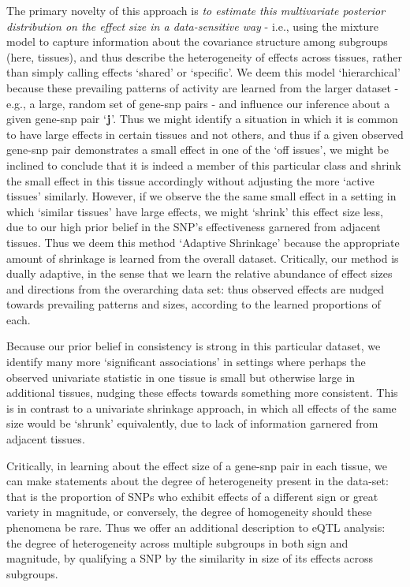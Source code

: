 The primary novelty of this approach is {\it to estimate this multivariate posterior distribution on the effect size in a data-sensitive way} - i.e., using the mixture model to capture information about the covariance structure among subgroups (here, tissues), and thus describe the heterogeneity of effects across tissues, rather than simply calling effects `shared' or `specific'. We deem this model `hierarchical' because these prevailing patterns of activity are learned from the larger dataset - e.g., a large, random set of gene-snp pairs - and influence our inference about a given gene-snp pair `$\bf{j}$'. Thus we might identify a situation in which it is common to have large effects in certain tissues and not others, and thus if a given observed gene-snp pair demonstrates a small effect in one of the `off issues', we might be inclined to conclude that it is indeed a member of this particular class and shrink the small effect in this tissue accordingly without adjusting the more `active tissues' similarly. However, if we observe the the same small effect in a setting in which `similar tissues' have large effects, we might `shrink' this effect size less, due to our high prior belief in the SNP's effectiveness garnered from adjacent tissues. Thus we deem this method `Adaptive Shrinkage' because the appropriate amount of shrinkage is learned from the overall dataset. Critically, our method is dually adaptive, in the sense that we learn the relative abundance of effect sizes and directions from the overarching data set: thus observed effects are nudged towards prevailing patterns and sizes, according to the learned proportions of each.

Because our prior belief in consistency is strong in this particular dataset, we identify many more `significant associations'  in settings where perhaps the observed univariate statistic in one tissue is small but otherwise large in additional tissues, nudging these effects towards something more consistent. This is in contrast to a univariate shrinkage approach, in which all effects of the same size would be `shrunk' equivalently, due to lack of information garnered from adjacent tissues. 
%

Critically, in learning about the effect size of a gene-snp pair in each tissue, we can make statements about the degree of heterogeneity present in the data-set: that is the proportion of SNPs who exhibit effects of a different sign or great variety in magnitude, or conversely, the degree of homogeneity should these phenomena be rare. Thus we offer an additional description to eQTL analysis: the degree of heterogeneity across multiple subgroups in both sign and magnitude, by qualifying a SNP by the similarity in size of its effects across subgroups. 
